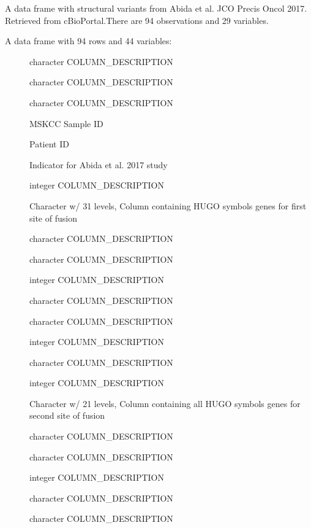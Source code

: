\documentclass[a4paper]{book}
\begin{document}
\begin{Format}
A data frame with structural variants from Abida et al. JCO Precis Oncol 2017.
Retrieved from cBioPortal.There are 94 observations and 29 variables.

A data frame with 94 rows and 44 variables:
\begin{description}

\item[] character COLUMN\_DESCRIPTION
\item[] character COLUMN\_DESCRIPTION
\item[] character COLUMN\_DESCRIPTION
\item[] MSKCC Sample ID
\item[] Patient ID
\item[] Indicator for Abida et al. 2017 study
\item[] integer COLUMN\_DESCRIPTION
\item[] Character w/ 31 levels,
Column containing HUGO symbols genes for first site of fusion
\item[] character COLUMN\_DESCRIPTION
\item[] character COLUMN\_DESCRIPTION
\item[] integer COLUMN\_DESCRIPTION
\item[] character COLUMN\_DESCRIPTION
\item[] character COLUMN\_DESCRIPTION
\item[] integer COLUMN\_DESCRIPTION
\item[] character COLUMN\_DESCRIPTION
\item[] integer COLUMN\_DESCRIPTION
\item[] Character w/ 21 levels,
Column containing all HUGO symbols genes for second site of fusion
\item[] character COLUMN\_DESCRIPTION
\item[] character COLUMN\_DESCRIPTION
\item[] integer COLUMN\_DESCRIPTION
\item[] character COLUMN\_DESCRIPTION
\item[] character COLUMN\_DESCRIPTION

\end{description}
\end{Format}
\end{document}
